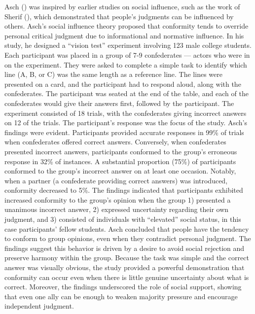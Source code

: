 \documentclass[
  letterpaper,
]{book}
\begin{document}
Asch () was inspired by earlier
studies on social influence, such as the work of Sherif
(), which demonstrated that
people's judgments can be influenced by others. Asch's social influence
theory proposed that conformity tends to override personal critical
judgment due to informational and normative influence. In his study, he
designed a ``vision test'' experiment involving 123 male college
students. Each participant was placed in a group of 7-9 confederates ---
actors who were in on the experiment. They were asked to complete a
simple task to identify which line (A, B, or C) was the same length as a
reference line. The lines were presented on a card, and the participant
had to respond aloud, along with the confederates. The participant was
seated at the end of the table, and each of the confederates would give
their answers first, followed by the participant. The experiment
consisted of 18 trials, with the confederates giving incorrect answers
on 12 of the trials. The participant's response was the focus of the
study. Asch's findings were evident. Participants provided accurate
responses in 99\% of trials when confederates offered correct answers.
Conversely, when confederates presented incorrect answers, participants
conformed to the group's erroneous response in 32\% of instances. A
substantial proportion (75\%) of participants conformed to the group's
incorrect answer on at least one occasion. Notably, when a partner (a
confederate providing correct answers) was introduced, conformity
decreased to 5\%. The findings indicated that participants exhibited
increased conformity to the group's opinion when the group 1) presented
a unanimous incorrect answer, 2) expressed uncertainty regarding their
own judgment, and 3) consisted of individuals with ``elevated'' social
status, in this case participants' fellow students. Asch concluded that
people have the tendency to conform to group opinions, even when they
contradict personal judgment. The findings suggest this behavior is
driven by a desire to avoid social rejection and preserve harmony within
the group. Because the task was simple and the correct answer was
visually obvious, the study provided a powerful demonstration that
conformity can occur even when there is little genuine uncertainty about
what is correct. Moreover, the findings underscored the role of social
support, showing that even one ally can be enough to weaken majority
pressure and encourage independent judgment.
\end{document}
